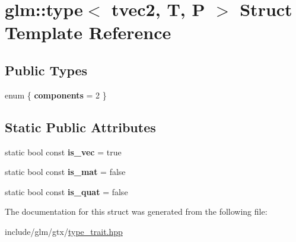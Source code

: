 \hypertarget{structglm_1_1type_3_01tvec2_00_01T_00_01P_01_4}{}\section{glm\+:\+:type$<$ tvec2, T, P $>$ Struct Template Reference}
\label{structglm_1_1type_3_01tvec2_00_01T_00_01P_01_4}
\subsection*{Public Types}
\begin{DoxyCompactItemize}
\item 
\mbox{\label{structglm_1_1type_3_01tvec2_00_01T_00_01P_01_4_aaa890e628df7bffef680d9e4efef25bb}} 
enum \{ {\bfseries components} = 2
 \}
\end{DoxyCompactItemize}
\subsection*{Static Public Attributes}
\begin{DoxyCompactItemize}
\item 
\mbox{\label{structglm_1_1type_3_01tvec2_00_01T_00_01P_01_4_aed111ecdb903d7e207978088eeeec8de}} 
static bool const {\bfseries is\+\_\+vec} = true
\item 
\mbox{\label{structglm_1_1type_3_01tvec2_00_01T_00_01P_01_4_ae7f076df719e4dc42c5ca75b0255859d}} 
static bool const {\bfseries is\+\_\+mat} = false
\item 
\mbox{\label{structglm_1_1type_3_01tvec2_00_01T_00_01P_01_4_afd8565961dba49d7045fd9c53a7b71d1}} 
static bool const {\bfseries is\+\_\+quat} = false
\end{DoxyCompactItemize}


The documentation for this struct was generated from the following file\+:\begin{DoxyCompactItemize}
\item 
include/glm/gtx/\hyperlink{type__trait_8hpp}{type\+\_\+trait.\+hpp}\end{DoxyCompactItemize}
